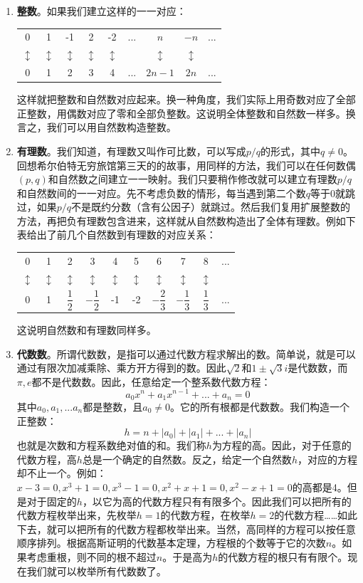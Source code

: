 \documentclass{article}
\begin{document}
\begin{enumerate}
\item \textbf{整数}。如果我们建立这样的一一对应：

\begin{tabular}{ccccccccc}
0 & 1 & -1 & 2 & -2 & ... & $n$ & $-n$ & ... \\
$\updownarrow$ & $\updownarrow$ & $\updownarrow$ & $\updownarrow$ & $\updownarrow$ & & $\updownarrow$ & $\updownarrow$ & \\
0 & 1 &  2 & 3 &  4 & ... & $2n - 1$ & $2n$ & ... \\
\end{tabular}

这样就把整数和自然数对应起来。换一种角度，我们实际上用奇数对应了全部正整数，用偶数对应了零和全部负整数。这说明全体整数和自然数一样多。换言之，我们可以用自然数构造整数。
\item \textbf{有理数}。我们知道，有理数又叫作可比数，可以写成$p/q$的形式，其中$q \neq 0$。回想希尔伯特无穷旅馆第三天的的故事，用同样的方法，我们可以在任何数偶$(p, q)$和自然数之间建立一一映射。我们只要稍作修改就可以建立有理数$p/q$和自然数间的一一对应。先不考虑负数的情形，每当遇到第二个数$q$等于0就跳过，如果$p/q$不是既约分数（含有公因子）就跳过。然后我们复用扩展整数的方法，再把负有理数包含进来，这样就从自然数构造出了全体有理数。例如下表给出了前几个自然数到有理数的对应关系：

\begin{tabular}{cccccccccc}
0 & 1 & 2 & 3 & 4 & 5 & 6 & 7 & 8 & ... \\
$\updownarrow$ & $\updownarrow$ & $\updownarrow$ & $\updownarrow$ & $\updownarrow$ & $\updownarrow$ & $\updownarrow$ & $\updownarrow$ & $\updownarrow$ & \\
0 & 1 & $\dfrac{1}{2}$ & $-\dfrac{1}{2}$ & -1 & -2 & $-\dfrac{2}{3}$ & $-\dfrac{1}{3}$ & $\dfrac{1}{3}$ & ... \\
\end{tabular}

这说明自然数和有理数同样多。

\item \textbf{代数数}。所谓代数数，是指可以通过代数方程求解出的数。简单说，就是可以通过有限次加减乘除、乘方开方得到的数。因此$\sqrt{2}$和$1 \pm \sqrt{3}i$是代数数，而$\pi, e$都不是代数数。因此，任意给定一个整系数代数方程：
\[
a_0 x^n + a_1 x^{n-1} + ... + a_n = 0
\]
其中$a_0, a_1, ... a_n$都是整数，且$a_0 \neq 0$。它的所有根都是代数数。我们构造一个正整数：
\[
h = n + |a_0| + |a_1| + ... + |a_n|
\]
也就是次数和方程系数绝对值的和。我们称$h$为方程的高。因此，对于任意的代数方程，高$h$总是一个确定的自然数。反之，给定一个自然数$h$，对应的方程却不止一个。例如：$x - 3 = 0, x^3 + 1 = 0, x^3 - 1 = 0, x^2 + x + 1 = 0, x^2 - x + 1 = 0$的高都是4。但是对于固定的$h$，以它为高的代数方程只有有限多个。因此我们可以把所有的代数方程枚举出来，先枚举$h=1$的代数方程，在枚举$h=2$的代数方程……如此下去，就可以把所有的代数方程都枚举出来。当然，高同样的方程可以按任意顺序排列。根据高斯证明的代数基本定理，方程根的个数等于它的次数$n$。如果考虑重根，则不同的根不超过$n$。于是高为$h$的代数方程的根只有有限个。现在我们就可以枚举所有代数数了。


\end{enumerate}
\end{document}
